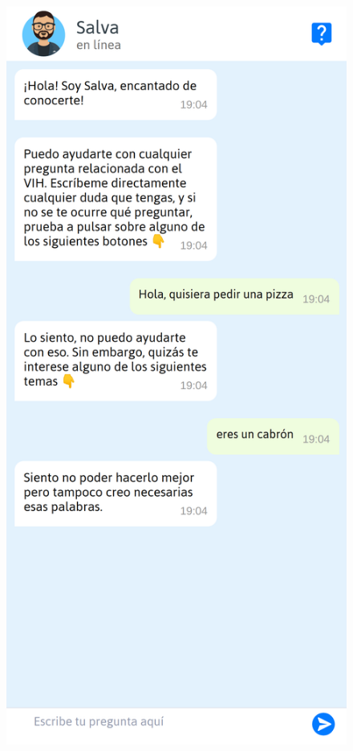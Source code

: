 \begin{figure}[htbp]
\centering
\includegraphics[scale=0.15]{../images/out_of_scope_2.png}

\end{figure}
